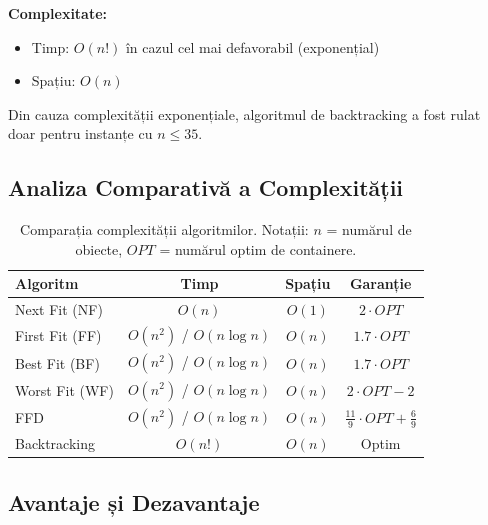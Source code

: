 \documentclass[runningheads]{llncs}
\begin{document}
\textbf{Complexitate:}
\begin{itemize}
    \item Timp: $O(n!)$ în cazul cel mai defavorabil (exponențial)
    \item Spațiu: $O(n)$
\end{itemize}

Din cauza complexității exponențiale, algoritmul de backtracking a fost rulat doar pentru instanțe cu $n \leq 35$.

\subsection{Analiza Comparativă a Complexității}

\begin{table}[H]
\centering
\caption{Comparația complexității algoritmilor. Notații: $n$ = numărul de obiecte, $OPT$ = numărul optim de containere.}
\label{tab:complexity}
\begin{tabular}{|l|c|c|c|}
\hline
\textbf{Algoritm} & \textbf{Timp} & \textbf{Spațiu} & \textbf{Garanție} \\
\hline
Next Fit (NF) & $O(n)$ & $O(1)$ & $2 \cdot OPT$ \\
First Fit (FF) & $O(n^2)$ / $O(n \log n)$ & $O(n)$ & $1.7 \cdot OPT$ \\
Best Fit (BF) & $O(n^2)$ / $O(n \log n)$ & $O(n)$ & $1.7 \cdot OPT$ \\
Worst Fit (WF) & $O(n^2)$ / $O(n \log n)$ & $O(n)$ & $2 \cdot OPT - 2$ \\
FFD & $O(n^2)$ / $O(n \log n)$ & $O(n)$ & $\frac{11}{9} \cdot OPT + \frac{6}{9}$ \\
Backtracking & $O(n!)$ & $O(n)$ & Optim \\
\hline
\end{tabular}
\end{table}

\subsection{Avantaje și Dezavantaje}
\end{document}
